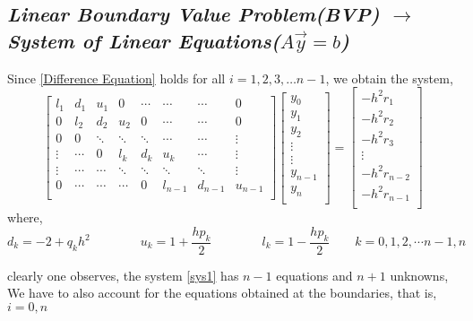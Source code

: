 \documentclass[12pt]{article}
\begin{document}
	\subsection{\textit{Linear Boundary Value Problem(BVP) $ \rightarrow $ System of Linear Equations($ A\vec{y} = b $)}}
	Since \ref{Difference Equation} holds for all $ i = 1,2,3,\dots n-1 $, we obtain the system,
	\begin{equation} \label{sys1}
	 \left[ \begin{matrix}
		l_1 & d_1 & u_1 & 0 &\cdots &\cdots&\cdots& 0\\
		0&l_2 & d_2 & u_2 &0 &\cdots&\cdots& 0\\
		0&0 & \ddots & \ddots &\ddots &\cdots&\cdots & \vdots\\
		\vdots&\cdots&0&l_k & d_k & u_k &\cdots& \vdots\\
		\vdots&\cdots&\cdots&\ddots & \ddots & \ddots &\ddots& \vdots\\
		0&\cdots&\cdots& \cdots&0 & l_{n-1} &d_{n-1}& u_{n-1}\\
		\end{matrix} \right]
	\left[ \begin{matrix}
		y_0\\
		y_1\\
		y_2\\
		\vdots\\
		\vdots\\
		y_{n-1}\\
		y_{n}\\
	\end{matrix} \right] =
		\left[ \begin{matrix}
		- h^2 r_1\\
		- h^2 r_2\\
		- h^2 r_3\\
		\vdots\\
		- h^2 r_{n-2}\\
		- h^2 r_{n-1}\\
	\end{matrix} \right]
	\end{equation}
	where,
	\begin{equation*}
		d_k = -2+q_k h^2 \qquad\qquad u_k = 1+\frac{h p_k}{2} \qquad\qquad l_k = 1-\frac{h p_k}{2} \qquad k = 0,1,2,\cdots n-1,n
	\end{equation*}
	
	clearly one observes, the system \ref{sys1} has $ n-1 $ equations and $ n+1 $ unknowns, We have to also account for the equations obtained at the boundaries, that is, $ i = 0,n $
	
\end{document}
